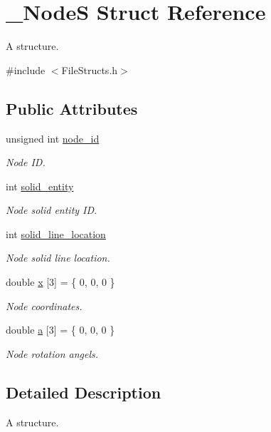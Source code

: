 \hypertarget{struct___node_s}{}\section{\+\_\+\+NodeS Struct Reference}
\label{struct___node_s}


A structure.  




{\ttfamily \#include $<$File\+Structs.\+h$>$}

\subsection*{Public Attributes}
\begin{DoxyCompactItemize}
\item 
unsigned int \hyperlink{struct___node_s_a03170eedacfbc42024a0e556858ead3f}{node\+\_\+id}
\begin{DoxyCompactList}\small\item\em Node ID. \end{DoxyCompactList}\item 
int \hyperlink{struct___node_s_a9ded714a4c7575d4dc9c721f8560f861}{solid\+\_\+entity}
\begin{DoxyCompactList}\small\item\em Node solid entity ID. \end{DoxyCompactList}\item 
int \hyperlink{struct___node_s_a486190cb5907d2695e87793dce313bbf}{solid\+\_\+line\+\_\+location}
\begin{DoxyCompactList}\small\item\em Node solid line location. \end{DoxyCompactList}\item 
double \hyperlink{struct___node_s_ab60b09e8b5b8009b574b9a0a49dd63fa}{x} \mbox{[}3\mbox{]} = \{ 0, 0, 0 \}
\begin{DoxyCompactList}\small\item\em Node coordinates. \end{DoxyCompactList}\item 
double \hyperlink{struct___node_s_a4af2fedf51326cedd3244b54a0684935}{a} \mbox{[}3\mbox{]} = \{ 0, 0, 0 \}
\begin{DoxyCompactList}\small\item\em Node rotation angels. \end{DoxyCompactList}\end{DoxyCompactItemize}


\subsection{Detailed Description}
A structure. 

